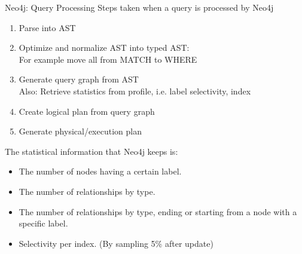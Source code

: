 \documentclass[rgb]{beamer}
\begin{document}
    \begin{frame}[allowframebreaks]{Neo4j: Query Processing}
        Steps taken when a query is processed by Neo4j
        \begin{enumerate}
            \item Parse into AST
            \item Optimize and normalize AST into typed AST: \\
            For example move all from MATCH to WHERE
            \item Generate query graph from AST \\
            Also: Retrieve statistics from profile, i.e. label selectivity, index
            \item Create logical plan from query graph
            \item Generate physical/execution plan 
        \end{enumerate}
        \framebreak
        The statistical information that Neo4j keeps is:
        \begin{itemize}
            \item The number of nodes having a certain label.
            \item The number of relationships by type.
            \item The number of relationships by type, ending or starting from a node with a specific label.
            \item  Selectivity per index. (By sampling 5\% after update)
        \end{itemize}
    \end{frame}
    
\end{document}
